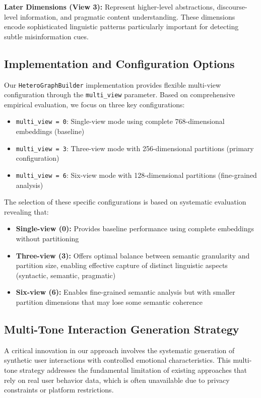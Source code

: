 \textbf{Later Dimensions (View 3):} Represent higher-level abstractions, discourse-level information, and pragmatic content understanding. These dimensions encode sophisticated linguistic patterns particularly important for detecting subtle misinformation cues.

\subsection{Implementation and Configuration Options}

Our \texttt{HeteroGraphBuilder} implementation provides flexible multi-view configuration through the \texttt{multi\_view} parameter. Based on comprehensive empirical evaluation, we focus on three key configurations:
\begin{itemize}
\item \texttt{multi\_view = 0}: Single-view mode using complete 768-dimensional embeddings (baseline)
\item \texttt{multi\_view = 3}: Three-view mode with 256-dimensional partitions (primary configuration)
\item \texttt{multi\_view = 6}: Six-view mode with 128-dimensional partitions (fine-grained analysis)
\end{itemize}

The selection of these specific configurations is based on systematic evaluation revealing that:
\begin{itemize}
\item \textbf{Single-view (0):} Provides baseline performance using complete embeddings without partitioning
\item \textbf{Three-view (3):} Offers optimal balance between semantic granularity and partition size, enabling effective capture of distinct linguistic aspects (syntactic, semantic, pragmatic)
\item \textbf{Six-view (6):} Enables fine-grained semantic analysis but with smaller partition dimensions that may lose some semantic coherence
\end{itemize}

\subsection{Multi-Tone Interaction Generation Strategy}

A critical innovation in our approach involves the systematic generation of synthetic user interactions with controlled emotional characteristics. This multi-tone strategy addresses the fundamental limitation of existing approaches that rely on real user behavior data, which is often unavailable due to privacy constraints or platform restrictions.


